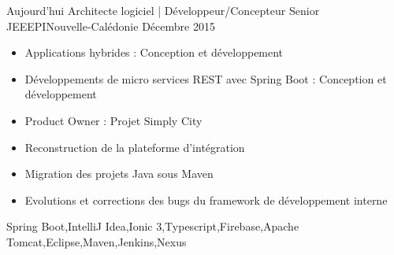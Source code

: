 
\horizontalLine
\begin{experiences}
  \experience
    {Aujourd'hui}   {Architecte logiciel | Développeur/Concepteur Senior JEE}{EPI}{Nouvelle-Calédonie}
    {Décembre 2015} {
                      \begin{itemize}
                        \item Applications hybrides : Conception et développement
                        \item Développements de micro services REST avec Spring Boot : Conception et développement
                        \item Product Owner : Projet Simply City
                        \item Reconstruction de la plateforme d'intégration
                        \item Migration des projets Java sous Maven
                        \item Evolutions et corrections des bugs du framework de développement interne
                      \end{itemize}
                    }
                    {Spring Boot,IntelliJ Idea,Ionic 3,Typescript,Firebase,Apache Tomcat,Eclipse,Maven,Jenkins,Nexus}
\end{experiences}